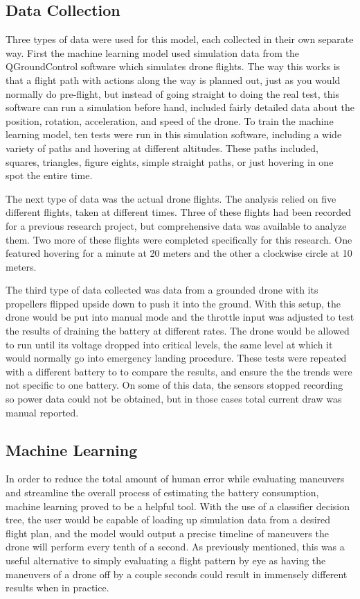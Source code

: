 \documentclass{article}
\begin{document}
\subsection{Data Collection}
Three types of data were used for this model, each collected in their own separate way. First the machine learning model used simulation data from the QGroundControl software which simulates drone flights. The way this works is that a flight path with actions along the way is planned out, just as you would normally do pre-flight, but instead of going straight to doing the real test, this software can run a simulation before hand, included fairly detailed data about the position, rotation, acceleration, and speed of the drone. To train the machine learning model, ten tests were run in this simulation software, including a wide variety of paths and hovering at different altitudes. These paths included, squares, triangles, figure eights, simple straight paths, or just hovering in one spot the entire time. \par

The next type of data was the actual drone flights. The analysis relied on five different flights, taken at different times. Three of these flights had been recorded for a previous research project, but comprehensive data was available to analyze them. Two more of these flights were completed specifically for this research. One featured hovering for a minute at 20 meters and the other a clockwise circle at 10 meters.\par

The third type of data collected was data from a grounded drone with its propellers flipped upside down to push it into the ground. With this setup, the drone would be put into manual mode and the throttle input was adjusted to test the results of draining the battery at different rates. The drone would be allowed to run until its voltage dropped into critical levels, the same level at which it would normally go into emergency landing procedure. These tests were repeated with a different battery to to compare the results, and ensure the the trends were not specific to one battery. On some of this data, the sensors stopped recording so power data could not be obtained, but in those cases total current draw was manual reported.


\subsection{Machine Learning}
In order to reduce the total amount of human error while evaluating maneuvers and streamline the overall process of estimating the battery consumption, machine learning proved to be a helpful tool. With the use of a classifier decision tree, the user would be capable of loading up simulation data from a desired flight plan, and the model would output a precise timeline of maneuvers the drone will perform every tenth of a second. As previously mentioned, this was a useful alternative to simply evaluating a flight pattern by eye as having the maneuvers of a drone off by a couple seconds could result in immensely different results when in practice. 
\end{document}
